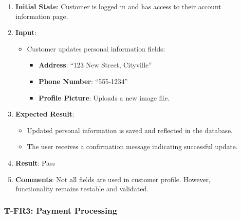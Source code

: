 \documentclass[12pt, titlepage]{article}
\begin{document}
\begin{enumerate}
    \item \textbf{Initial State}: Customer is logged in and has access to their account information page.
    \item \textbf{Input}:
    \begin{itemize}
        \item Customer updates personal information fields:
        \begin{itemize}
            \item \textbf{Address}: ``123 New Street, Cityville''
            \item \textbf{Phone Number}: ``555-1234''
            \item \textbf{Profile Picture}: Uploads a new image file.
        \end{itemize}
    \end{itemize}
    
        \item \textbf{Expected Result}:
        \begin{itemize}
            \item Updated personal information is saved and reflected in the database.
            \item The user receives a confirmation message indicating successful update.
        \end{itemize}
        \item \textbf{Result}: Pass
        \item \textbf{Comments}: Not all fields are used in customer profile. However, functionality remains testable and validated.
\end{enumerate}

\subsubsection*{T-FR3: Payment Processing}
\end{document}
